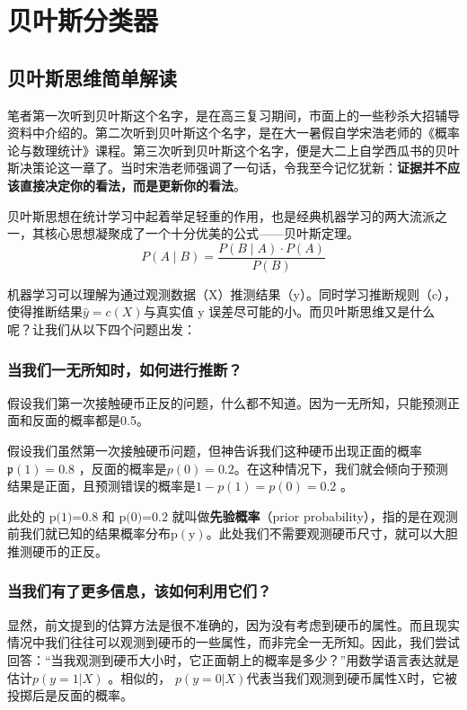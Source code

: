 \section{贝叶斯分类器}

\subsection{贝叶斯思维简单解读}
笔者第一次听到贝叶斯这个名字，是在高三复习期间，市面上的一些秒杀大招辅导资料中介绍的。第二次听到贝叶斯这个名字，是在大一暑假自学宋浩老师的《概率论与数理统计》课程。第三次听到贝叶斯这个名字，便是大二上自学西瓜书的贝叶斯决策论这一章了。当时宋浩老师强调了一句话，令我至今记忆犹新：\textbf{证据并不应该直接决定你的看法，而是更新你的看法}。

贝叶斯思想在统计学习中起着举足轻重的作用，也是经典机器学习的两大流派之一，其核心思想凝聚成了一个十分优美的公式——贝叶斯定理。
\setcounter{equation}{0} %
\begin{equation}P(A\mid B)=\frac{P(B\mid A)\cdot P(A)}{P(B)}\end{equation}

机器学习可以理解为通过观测数据（X）推测结果（y）。同时学习推断规则（c），使得推断结果$\hat y=c(X)$与真实值 y 误差尽可能的小。而贝叶斯思维又是什么呢？让我们从以下四个问题出发：

\subsubsection{当我们一无所知时，如何进行推断？}
假设我们第一次接触硬币正反的问题，什么都不知道。因为一无所知，只能预测正面和反面的概率都是0.5。

假设我们虽然第一次接触硬币问题，但神告诉我们这种硬币出现正面的概率$\mathfrak{p}(1)=0.8$ ，反面的概率是$p(0)=0.2$。在这种情况下，我们就会倾向于预测结果是正面，且预测错误的概率是$1-p(1)=p(0)=0.2$  。

此处的 $\text{p(1)=0.8 和 p(0)=0.2}$ 就叫做\textbf{先验概率}（prior probability），指的是在观测前我们就已知的结果概率分布$\mathrm{p(y)}$。此处我们不需要观测硬币尺寸，就可以大胆推测硬币的正反。

\subsubsection{当我们有了更多信息，该如何利用它们？}
显然，前文提到的估算方法是很不准确的，因为没有考虑到硬币的属性。而且现实情况中我们往往可以观测到硬币的一些属性，而非完全一无所知。因此，我们尝试回答：“当我观测到硬币大小时，它正面朝上的概率是多少？”用数学语言表达就是估计$p(y=1|X)$ 。相似的， $p(y=0|X)$代表当我们观测到硬币属性X时，它被投掷后是反面的概率。

